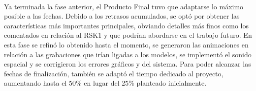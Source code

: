 \documentclass{subfiles}
\begin{document}
        \paragraph{}
        Ya terminada la fase anterior, el Producto Final tuvo que adaptarse lo máximo posible a las fechas. Debido a los retrasos acumulados, se optó por obtener las características más importantes principales, obviando detalles más finos como los comentados en relación al RSK1 y que podrían abordarse en el trabajo futuro. En esta fase se refinó lo obtenido hasta el momento, se generaron las animaciones en relación a las grabaciones que irían ligadas a los modelos, se implementó el sonido espacial y se corrigieron los errores gráficos y del sistema. Para poder alcanzar las fechas de finalización, también se adaptó el tiempo dedicado al proyecto, aumentando hasta el 50\% en lugar del 25\% planteado inicialmente.

\end{document}
